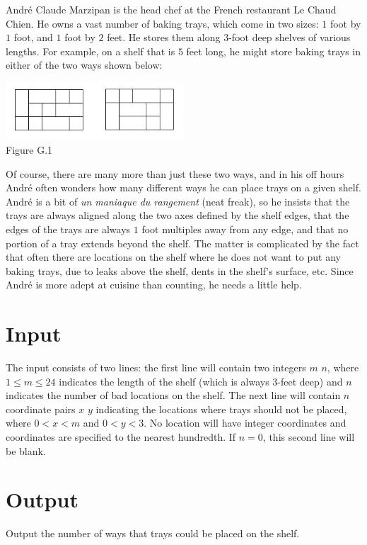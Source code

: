 
Andr\'{e} Claude Marzipan is the head chef at the French restaurant Le Chaud
Chien. He owns a vast number of baking trays, which come in two sizes: $1$ foot
by $1$ foot, and $1$ foot by $2$ feet. He stores them along $3$-foot deep
shelves of various lengths. For example, on a shelf that is $5$ feet long, he
might store baking trays in either of the two ways shown below:
\begin{center}
\includegraphics[width=0.5\textwidth]{trays.jpg}\\
Figure G.1
\end{center}

Of course, there are many more than just these two ways, and in his off hours
Andr\'{e} often wonders how many different ways he can place trays on a given
shelf. Andr\'{e} is a bit of \emph{un maniaque du rangement} (neat freak), so he
insists that the trays are always aligned along the two axes defined by the
shelf edges, that the edges of the trays are always $1$ foot multiples away from
any edge, and that no portion of a tray extends beyond the shelf. The matter is
complicated by the fact that often there are locations on the shelf where he
does not want to put any baking trays, due to leaks above the shelf, dents in
the shelf's surface, etc. Since Andr\'{e} is more adept at cuisine than
counting, he needs a little help.

\section*{Input}

The input consists of two lines: the first line will contain two integers $m$
$n$, where $1\le m\leq24$ indicates the length of the shelf (which is always
$3$-feet deep) and $n$ indicates the number of bad locations on the shelf. The
next line will contain $n$ coordinate pairs $x$ $y$ indicating the locations
where trays should not be placed, where $0<x<m$ and $0<y<3$. No location will
have integer coordinates and coordinates are specified to the nearest hundredth.
If $n=0$, this second line will be blank.
\newpage
\section*{Output}

Output the number of ways that trays could be placed on the shelf.

